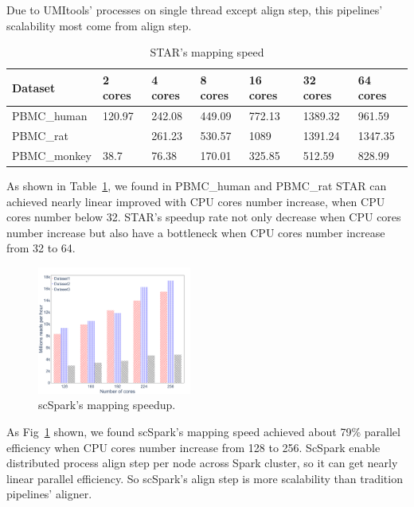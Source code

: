 \documentclass[conference]{IEEEtran}
\begin{document}
Due to UMI\-tools' processes on single thread except align step, this pipelines' scalability most come from align step.
\begin{table}
	\centering
	\caption{STAR's mapping speed}\label{tab3}
	\resizebox{0.45\textwidth}{!} {
	\begin{tabular}{l | l | l | l | l | l | l}
		\hline
		Dataset & 2 cores & 4 cores & 8 cores & 16 cores & 32 cores & 64 cores \\
		\hline
		PBMC\_human & 120.97 & 242.08 & 449.09 & 772.13 & 1389.32 & 961.59 \\
		PBMC\_rat &  & 261.23 & 530.57 & 1089 & 1391.24 & 1347.35 \\
		PBMC\_monkey  & 38.7 & 76.38 & 170.01 & 325.85 & 512.59 & 828.99 \\
		\hline
	\end{tabular} }
\end{table}
As shown in Table~\ref{tab3}, we found in PBMC\_human and PBMC\_rat STAR can achieved nearly linear improved with CPU cores number increase, when CPU cores number below 32.
STAR's speedup rate not only decrease when CPU cores number increase but also have a bottleneck when CPU cores number increase from 32 to 64.
\begin{figure}
	\includegraphics[width=0.45\textwidth]{fig7.pdf}
	\caption{scSpark's mapping speedup.} \label{fig7}
\end{figure}
As Fig~\ref{fig7} shown, we found scSpark's mapping speed achieved about 79\% parallel efficiency when CPU cores number increase from 128 to 256.
ScSpark enable distributed process align step per node across Spark cluster, so it can get nearly linear parallel efficiency.
So scSpark's align step is more scalability than tradition pipelines' aligner. 
\end{document}
